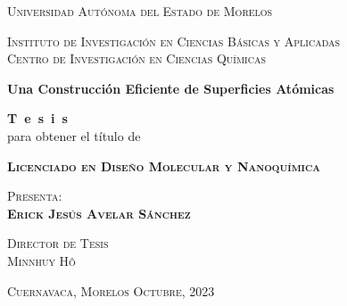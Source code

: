 
\begin{titlepage}
%
%
%
\begin{center}
	\vspace*{.02\textheight}
	{\scshape\LARGE Universidad Autónoma del Estado de Morelos \par}
	\vspace{0.5cm}
		
	\textsc{\Large Instituto de Investigación en Ciencias Básicas y Aplicadas}\\[0.5cm] 
		
	\textsc{\Large Centro de Investigación en Ciencias Químicas}\\[1.0cm]
				 
	{\huge \bfseries Una Construcción Eficiente de Superficies Atómicas \par}
	    
	\vspace{2.0cm}
                
	\textbf{T\ e\ s\ i\ s}\\
	{para obtener el título de}
      
	\vspace{0.8cm}

	\textsc{\Large \bfseries Licenciado en Diseño Molecular y Nanoquímica}\\[1.0cm]    
        
	\vspace{0.8cm}
            
	\textsc{\large Presenta:} \\[0.2cm]
	\textsc{\large \bfseries Erick Jesús Avelar Sánchez}
            
	\vspace{0.8cm}
        
	\textsc{\large Director de Tesis}\\[0.2cm]
  \textsc{\large Minnhuy Hô}               
\end{center}
    
\vspace*{\fill}
\textsc{\large Cuernavaca, Morelos} \hfill \textsc{\large Octubre, 2023}

\end{titlepage}
